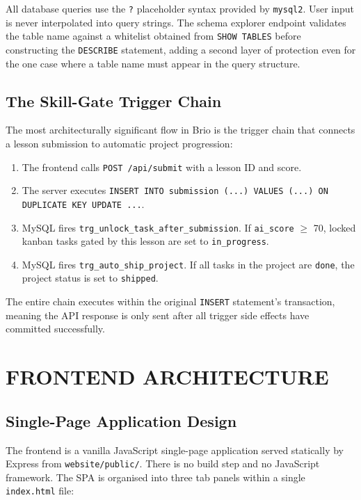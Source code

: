 \documentclass[12pt,a4paper]{article}
\begin{document}
All database queries use the \texttt{?} placeholder syntax provided by \texttt{mysql2}. User
input is never interpolated into query strings. The schema explorer endpoint validates the table
name against a whitelist obtained from \texttt{SHOW TABLES} before constructing the
\texttt{DESCRIBE} statement, adding a second layer of protection even for the one case where a
table name must appear in the query structure.

\subsection{The Skill-Gate Trigger Chain}

The most architecturally significant flow in Brio is the trigger chain that connects a lesson
submission to automatic project progression:

\begin{enumerate}[label=\arabic*., itemsep=4pt]
    \item The frontend calls \texttt{POST /api/submit} with a lesson ID and score.
    \item The server executes \texttt{INSERT INTO submission (...) VALUES (...) ON DUPLICATE KEY
          UPDATE ...}.
    \item MySQL fires \texttt{trg\_unlock\_task\_after\_submission}. If \texttt{ai\_score}
          $\geq$ 70, locked kanban tasks gated by this lesson are set to \texttt{in\_progress}.
    \item MySQL fires \texttt{trg\_auto\_ship\_project}. If all tasks in the project are
          \texttt{done}, the project status is set to \texttt{shipped}.
\end{enumerate}

The entire chain executes within the original \texttt{INSERT} statement's transaction, meaning
the API response is only sent after all trigger side effects have committed successfully.

\section{FRONTEND ARCHITECTURE}

\subsection{Single-Page Application Design}

The frontend is a vanilla JavaScript single-page application served statically by Express from
\texttt{website/public/}. There is no build step and no JavaScript framework. The SPA is
organised into three tab panels within a single \texttt{index.html} file:
\end{document}
